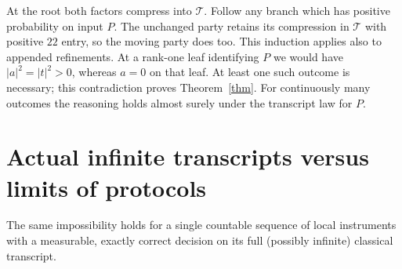 \documentclass[11pt]{article}
\begin{document}
At the root both factors compress into $\mathcal T$. Follow any branch which has positive probability on input $P$. The unchanged party retains its compression in $\mathcal T$ with positive $22$ entry, so the moving party does too. This induction applies also to appended refinements. At a rank-one leaf identifying $P$ we would have $|a|^2=|t|^2>0$, whereas $a=0$ on that leaf. At least one such outcome is necessary; this contradiction proves Theorem~\ref{thm}. For continuously many outcomes the reasoning holds almost surely under the transcript law for $P$.

\section{Actual infinite transcripts versus limits of protocols}
\begin{proposition}
The same impossibility holds for a single countable sequence of local instruments with a measurable, exactly correct decision on its full (possibly infinite) classical transcript.
\end{proposition}
\end{document}
